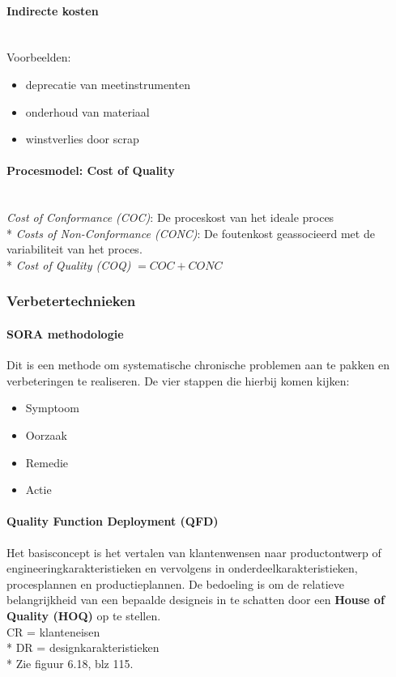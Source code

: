 \documentclass[12pt]{article}
\begin{document}
\paragraph{Indirecte kosten}\mbox{}\\
Voorbeelden:
\begin{itemize}
\item deprecatie van meetinstrumenten
\item onderhoud van materiaal
\item winstverlies door scrap
\end{itemize}
\paragraph{Procesmodel: Cost of Quality}\mbox{}\\
\textit{Cost of Conformance (COC)}: De proceskost van het ideale proces\\*
\textit{Costs of Non-Conformance (CONC)}: De foutenkost geassocieerd met de variabiliteit van het proces.\\*
\textit{Cost of Quality (COQ)} $= COC + CONC$
\subsubsection{Verbetertechnieken}
\paragraph{SORA methodologie}
Dit is een methode om systematische chronische problemen aan te pakken en verbeteringen te realiseren. De vier stappen die hierbij komen kijken:
\begin{itemize}
\item Symptoom
\item Oorzaak
\item Remedie
\item Actie
\end{itemize}
\paragraph{Quality Function Deployment (QFD)}
Het basisconcept is het vertalen van klantenwensen naar productontwerp of engineeringkarakteristieken en vervolgens in onderdeelkarakteristieken, procesplannen en productieplannen. De bedoeling is om de relatieve belangrijkheid van een bepaalde designeis in te schatten door een \textbf{House of Quality (HOQ)} op te stellen.\\
CR = klanteneisen\\*
DR = designkarakteristieken\\*
Zie figuur 6.18, blz 115.
\end{document}
